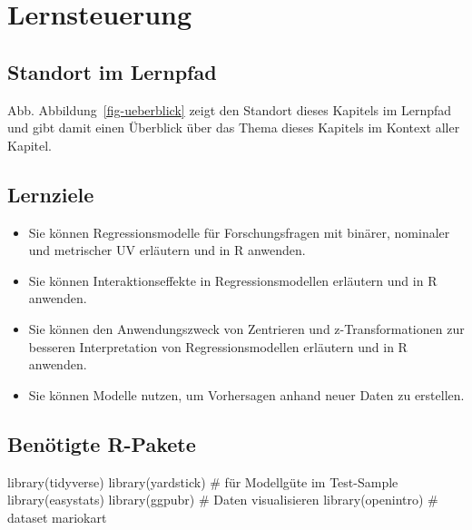 \documentclass[
  letterpaper,
]{scrbook}
\newenvironment{Shaded}{\begin{snugshade}}{\end{snugshade}}
\newcommand{\CommentTok}[1]{\textcolor[rgb]{0.37,0.37,0.37}{#1}}
\newcommand{\FunctionTok}[1]{\textcolor[rgb]{0.28,0.35,0.67}{#1}}
\newcommand{\NormalTok}[1]{\textcolor[rgb]{0.00,0.23,0.31}{#1}}
\providecommand{\tightlist}{%
  \setlength{\itemsep}{0pt}\setlength{\parskip}{0pt}}\usepackage{longtable,booktabs,array}
\theoremstyle{definition}
\theoremstyle{definition}
\theoremstyle{definition}
\theoremstyle{remark}
\begin{document}
\section{Lernsteuerung}\label{lernsteuerung-8}

\subsection{Standort im Lernpfad}\label{standort-im-lernpfad-1}

Abb. Abbildung~\ref{fig-ueberblick} zeigt den Standort dieses Kapitels
im Lernpfad und gibt damit einen Überblick über das Thema dieses
Kapitels im Kontext aller Kapitel.

\subsection{Lernziele}\label{lernziele-9}

\begin{itemize}
\tightlist
\item
  Sie können Regressionsmodelle für Forschungsfragen mit binärer,
  nominaler und metrischer UV erläutern und in R anwenden.
\item
  Sie können Interaktionseffekte in Regressionsmodellen erläutern und in
  R anwenden.
\item
  Sie können den Anwendungszweck von Zentrieren und z-Transformationen
  zur besseren Interpretation von Regressionsmodellen erläutern und in R
  anwenden.
\item
  Sie können Modelle nutzen, um Vorhersagen anhand neuer Daten zu
  erstellen.
\end{itemize}

\subsection{Benötigte R-Pakete}\label{benuxf6tigte-r-pakete-7}

\begin{Shaded}
\begin{Highlighting}[]
\FunctionTok{library}\NormalTok{(tidyverse)}
\FunctionTok{library}\NormalTok{(yardstick)  }\CommentTok{\# für Modellgüte im Test{-}Sample}
\FunctionTok{library}\NormalTok{(easystats)}
\FunctionTok{library}\NormalTok{(ggpubr)  }\CommentTok{\# Daten visualisieren}
\FunctionTok{library}\NormalTok{(openintro)  }\CommentTok{\# dataset mariokart}
\end{Highlighting}
\end{Shaded}
\end{document}
